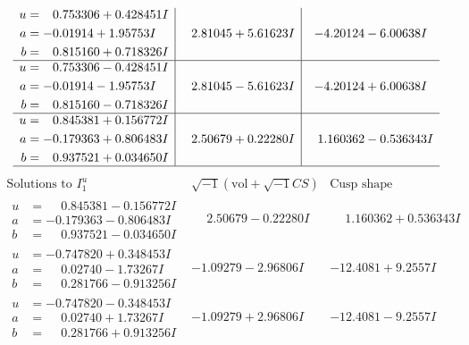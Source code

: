 \documentclass[1p]{elsarticle_modified}
\theoremstyle{definition}
\newcommand{\I}{\sqrt{-1}}
\begin{document}
$$\begin{array}{c|c|c}
\begin{aligned}
u &= \phantom{-}0.753306 + 0.428451 I \\
a &= -0.01914 + 1.95753 I \\
b &= \phantom{-}0.815160 + 0.718326 I\end{aligned}
 & \phantom{-}2.81045 + 5.61623 I & -4.20124 - 6.00638 I \\ \hline\begin{aligned}
u &= \phantom{-}0.753306 - 0.428451 I \\
a &= -0.01914 - 1.95753 I \\
b &= \phantom{-}0.815160 - 0.718326 I\end{aligned}
 & \phantom{-}2.81045 - 5.61623 I & -4.20124 + 6.00638 I \\ \hline\begin{aligned}
u &= \phantom{-}0.845381 + 0.156772 I \\
a &= -0.179363 + 0.806483 I \\
b &= \phantom{-}0.937521 + 0.034650 I\end{aligned}
 & \phantom{-}2.50679 + 0.22280 I & \phantom{-}1.160362 - 0.536343 I\\
 \hline 
 \end{array}$$\newpage$$\begin{array}{c|c|c}  
\text{Solutions to }I^u_{1}& \I (\text{vol} + \sqrt{-1}CS) & \text{Cusp shape}\\
 \hline 
\begin{aligned}
u &= \phantom{-}0.845381 - 0.156772 I \\
a &= -0.179363 - 0.806483 I \\
b &= \phantom{-}0.937521 - 0.034650 I\end{aligned}
 & \phantom{-}2.50679 - 0.22280 I & \phantom{-}1.160362 + 0.536343 I \\ \hline\begin{aligned}
u &= -0.747820 + 0.348453 I \\
a &= \phantom{-}0.02740 - 1.73267 I \\
b &= \phantom{-}0.281766 - 0.913256 I\end{aligned}
 & -1.09279 - 2.96806 I & -12.4081 + 9.2557 I \\ \hline\begin{aligned}
u &= -0.747820 - 0.348453 I \\
a &= \phantom{-}0.02740 + 1.73267 I \\
b &= \phantom{-}0.281766 + 0.913256 I\end{aligned}
 & -1.09279 + 2.96806 I & -12.4081 - 9.2557 I \\ \hline\begin{aligned}

\end{aligned}
\end{array}$$
\end{document}
